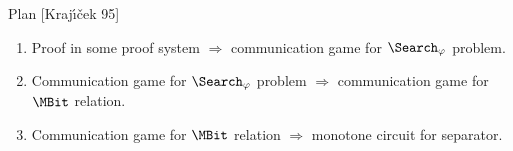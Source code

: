 \begin{frame}{Plan [Kraj{\'{\i}}{\v{c}}ek 95]}

    \begin{enumerate}
        \item Proof in some proof system $\Rightarrow$ communication game for $\Search_{\varphi}$
            problem.
        \item Communication game for $\Search_{\varphi}$ problem $\Rightarrow$ communication game for
            $\MBit$ relation.
        \item Communication game for $\MBit$ relation $\Rightarrow$ monotone circuit for separator.
    \end{enumerate}
\end{frame}